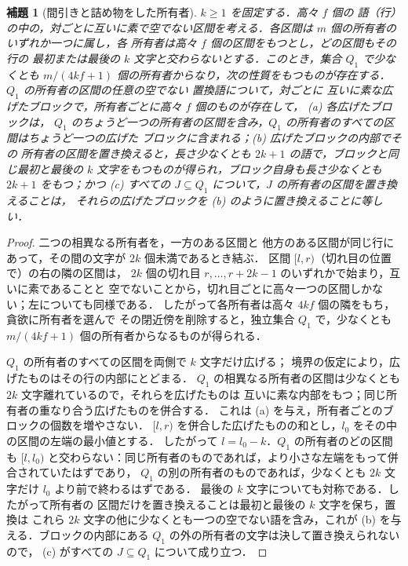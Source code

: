 \documentclass[11pt,a4paper]{ltjsarticle}
\numberwithin{equation}{section}
\theoremstyle{plain}
\newtheorem{lemma}[theorem]{補題}
\theoremstyle{definition}
\theoremstyle{remark}
\theoremstyle{plain}
\begin{document}
\begin{lemma}[間引きと詰め物をした所有者]
\label{lem:lg-buffered-owners}
$k\ge1$ を固定する．高々 $f$ 個の
語（\emph{行}）の中の，対ごとに互いに素で空でない区間を考える．各区間は $m$ 個の所有者のいずれか一つに属し，各
所有者は高々 $f$ 個の区間をもつとし，どの区間もその行の
最初または最後の $k$ 文字と交わらないとする．このとき，集合 $Q_1$ で少なくとも
$m/(4kf+1)$ 個の所有者からなり，次の性質をもつものが存在する．$Q_1$ の所有者の区間の任意の空でない
置換語について，対ごとに
互いに素な\emph{広げたブロック}で，所有者ごとに高々 $f$ 個のものが存在して，
\textup{(a)} 各広げたブロックは，
$Q_1$ のちょうど一つの所有者の区間を含み，$Q_1$ の所有者のすべての区間はちょうど一つの広げた
ブロックに含まれる；\textup{(b)} 広げたブロックの内部でその
所有者の区間を置き換えると，長さ少なくとも $2k+1$ の語で，ブロックと同じ最初と最後の
$k$ 文字をもつものが得られ，ブロック自身も長さ少なくとも $2k+1$ をもつ；かつ
\textup{(c)} すべての $J\subseteq Q_1$ について，$J$ の所有者の区間を置き換えることは，
それらの広げたブロックを \textup{(b)} のように置き換えることに等しい．
\end{lemma}

\begin{proof}
二つの相異なる所有者を，一方のある区間と
他方のある区間が同じ行にあって，その間の文字が $2k$ 個未満であるとき結ぶ．
区間 $[l,r)$（切れ目の位置で）の右の隣の区間は，
$2k$ 個の切れ目 $r,\ldots,r+2k-1$ のいずれかで始まり，互いに素であることと
空でないことから，切れ目ごとに高々一つの区間しかない；左についても同様である．
したがって各所有者は高々 $4kf$ 個の隣をもち，貪欲に所有者を選んで
その閉近傍を削除すると，独立集合 $Q_1$ で，少なくとも
$m/(4kf+1)$ 個の所有者からなるものが得られる．

$Q_1$ の所有者のすべての区間を両側で $k$ 文字だけ広げる；
境界の仮定により，広げたものはその行の内部にとどまる．
$Q_1$ の相異なる所有者の区間は少なくとも $2k$ 文字離れているので，それらを広げたものは
互いに素な内部をもつ；同じ所有者の重なり合う広げたものを併合する．
これは (a) を与え，所有者ごとのブロックの個数を増やさない．
$[l,r)$ を併合した広げたものの和とし，$l_0$ をその中の区間の左端の最小値とする．
したがって $l=l_0-k$．$Q_1$ の所有者のどの区間も
$[l,l_0)$ と交わらない：同じ所有者のものであれば，より小さな左端をもって併合されていたはずであり，
$Q_1$ の別の所有者のものであれば，少なくとも $2k$ 文字だけ $l_0$ より前で終わるはずである．
最後の $k$ 文字についても対称である．したがって所有者の
区間だけを置き換えることは最初と最後の $k$ 文字を保ち，置換は
これら $2k$ 文字の他に少なくとも一つの空でない語を含み，これが
(b) を与える．ブロックの内部にある $Q_1$ の外の所有者の文字は決して置き換えられないので，
(c) がすべての $J\subseteq Q_1$ について成り立つ．
\end{proof}
\end{document}
